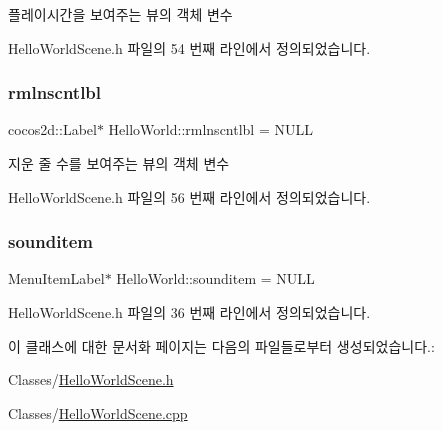 플레이시간을 보여주는 뷰의 객체 변수 



Hello\+World\+Scene.\+h 파일의 54 번째 라인에서 정의되었습니다.

\mbox{\label{class_hello_world_a52aca4f2a78e6413ace505d313b006fc}} 
\subsubsection{\texorpdfstring{rmlnscntlbl}{rmlnscntlbl}}
{\footnotesize\ttfamily cocos2d\+::\+Label$\ast$ Hello\+World\+::rmlnscntlbl = N\+U\+LL\hspace{0.3cm}{\ttfamily [protected]}}



지운 줄 수를 보여주는 뷰의 객체 변수 



Hello\+World\+Scene.\+h 파일의 56 번째 라인에서 정의되었습니다.

\mbox{\label{class_hello_world_adb09915c0ac4077d51f46e2645bc4c0a}} 
\subsubsection{\texorpdfstring{sounditem}{sounditem}}
{\footnotesize\ttfamily Menu\+Item\+Label$\ast$ Hello\+World\+::sounditem = N\+U\+LL}



Hello\+World\+Scene.\+h 파일의 36 번째 라인에서 정의되었습니다.



이 클래스에 대한 문서화 페이지는 다음의 파일들로부터 생성되었습니다.\+:\begin{DoxyCompactItemize}
\item 
Classes/\hyperlink{_hello_world_scene_8h}{Hello\+World\+Scene.\+h}\item 
Classes/\hyperlink{_hello_world_scene_8cpp}{Hello\+World\+Scene.\+cpp}\end{DoxyCompactItemize}
